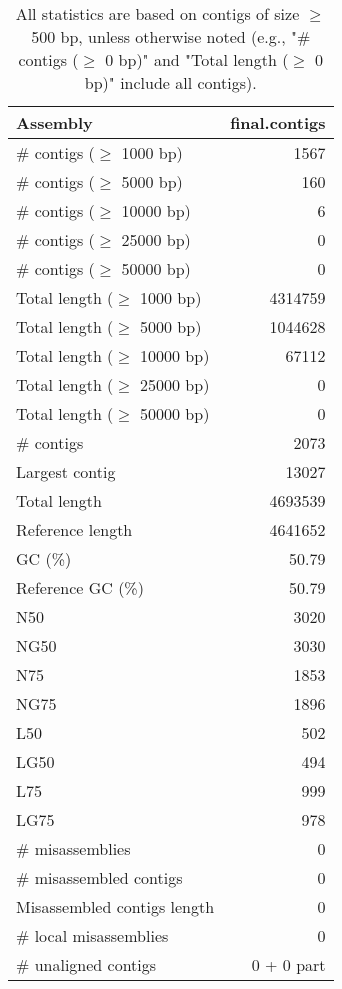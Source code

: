 \documentclass[12pt,a4paper]{article}
\begin{document}
\begin{table}[ht]
\begin{center}
\caption{All statistics are based on contigs of size $\geq$ 500 bp, unless otherwise noted (e.g., "\# contigs ($\geq$ 0 bp)" and "Total length ($\geq$ 0 bp)" include all contigs).}
\begin{tabular}{|l*{1}{|r}|}
\hline
Assembly & final.contigs \\ \hline
\# contigs ($\geq$ 1000 bp) & 1567 \\ \hline
\# contigs ($\geq$ 5000 bp) & 160 \\ \hline
\# contigs ($\geq$ 10000 bp) & 6 \\ \hline
\# contigs ($\geq$ 25000 bp) & 0 \\ \hline
\# contigs ($\geq$ 50000 bp) & 0 \\ \hline
Total length ($\geq$ 1000 bp) & 4314759 \\ \hline
Total length ($\geq$ 5000 bp) & 1044628 \\ \hline
Total length ($\geq$ 10000 bp) & 67112 \\ \hline
Total length ($\geq$ 25000 bp) & 0 \\ \hline
Total length ($\geq$ 50000 bp) & 0 \\ \hline
\# contigs & 2073 \\ \hline
Largest contig & 13027 \\ \hline
Total length & 4693539 \\ \hline
Reference length & 4641652 \\ \hline
GC (\%) & 50.79 \\ \hline
Reference GC (\%) & 50.79 \\ \hline
N50 & 3020 \\ \hline
NG50 & 3030 \\ \hline
N75 & 1853 \\ \hline
NG75 & 1896 \\ \hline
L50 & 502 \\ \hline
LG50 & 494 \\ \hline
L75 & 999 \\ \hline
LG75 & 978 \\ \hline
\# misassemblies & 0 \\ \hline
\# misassembled contigs & 0 \\ \hline
Misassembled contigs length & 0 \\ \hline
\# local misassemblies & 0 \\ \hline
\# unaligned contigs & 0 + 0 part \\ \hline

\end{tabular}
\end{center}
\end{table}
\end{document}
